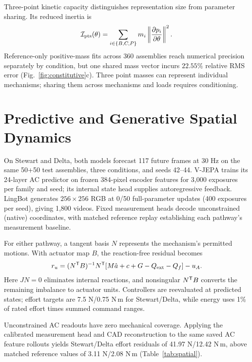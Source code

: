\documentclass[10pt,twocolumn,letterpaper]{article}
\begin{document}
Three-point kinetic capacity distinguishes representation size from parameter sharing. Its reduced inertia is
\begin{equation}
\mathcal I_{\rm pts}(\theta)=\sum_{i\in\{B,C,P\}}m_i
\left\|\frac{\partial p_i}{\partial\theta}\right\|^2.
\label{eq:capacity}
\end{equation}
Reference-only positive-mass fits across 360 assemblies reach numerical precision separately by condition, but one shared mass vector incurs $22.55\%$ relative RMS error (Fig.~\ref{fig:constitutive}c). Three point masses can represent individual mechanisms; sharing them across mechanisms and loads requires conditioning.

\section{Predictive and Generative Spatial Dynamics}
\label{sec:spatial}
On Stewart and Delta, both models forecast 117 future frames at 30 Hz on the same 50+50 test assemblies, three conditions, and seeds 42--44. V-JEPA trains its 24-layer AC predictor on frozen 384-pixel encoder features for 3,000 exposures per family and seed; its internal state head supplies autoregressive feedback. LingBot generates $256\times256$ RGB at 0/50 full-parameter updates (400 exposures per seed), giving 1,800 videos. Fixed measurement heads decode unconstrained (native) coordinates, with matched reference replay establishing each pathway's measurement baseline.

For either pathway, a tangent basis $N$ represents the mechanism's permitted motions. With actuator map $B$, the reaction-free residual becomes
\begin{equation}
r_u=(N^{\mathsf T} B)^{-1}N^{\mathsf T}[M\hat a+c+G-Q_{\rm ext}-Q_f]-u_A.
\label{eq:spatial-effort}
\end{equation}
Here $JN=0$ eliminates internal reactions, and nonsingular $N^{\mathsf T} B$ converts the remaining imbalance to actuator units. Controllers are reevaluated at predicted states; effort targets are 7.5 N/0.75 N\,m for Stewart/Delta, while energy uses 1\% of rated effort times summed command ranges.

Unconstrained AC readouts have zero mechanical coverage. Applying the calibrated measurement head and CAD reconstruction to the same saved AC feature rollouts yields Stewart/Delta effort residuals of 41.97 N/12.42 N\,m, above matched reference values of 3.11 N/2.08 N\,m (Table~\ref{tab:spatial}).
\end{document}

